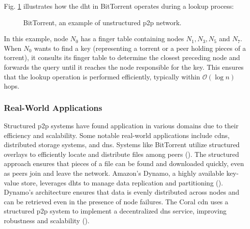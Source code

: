 Fig. \ref{fig:BitTorrent} illustrates how the \gls{dht} in BitTorrent operates during a lookup process:
\begin{figure}[htbp]
    \centering
{}
\caption{BitTorrent, an example of unstructured \gls{p2p} network.}
\label{fig:BitTorrent}
\end{figure}

In this example, node $N_0$ has a finger table containing nodes $N_1, N_3, N_5$ and $N_7$.
When $N_0$ wants to find a key (representing a torrent or a peer holding pieces of a torrent), it consults its finger table to determine the closest preceding node and forwards the query until it reaches the node responsible for the key.
This ensures that the lookup operation is performed efficiently, typically within $\mathcal{O}(\log n)$ hops.

\subsubsection*{Real-World Applications}
Structured \gls{p2p} systems have found application in various domains due to their efficiency and scalability.
Some notable real-world applications include \glspl{cdn}, distributed storage systems, and \gls{dns}.
Systems like BitTorrent utilize structured overlays to efficiently locate and distribute files among peers (\cite{cohen2003incentives}).
The structured approach ensures that pieces of a file can be found and downloaded quickly, even as peers join and leave the network.
Amazon's Dynamo, a highly available key-value store, leverages \glspl{dht} to manage data replication and partitioning (\cite{DeCandia2007}).
Dynamo's architecture ensures that data is evenly distributed across nodes and can be retrieved even in the presence of node failures.
The Coral \gls{cdn} uses a structured \gls{p2p} system to implement a decentralized \gls{dns} service, improving robustness and scalability (\cite{CoralCDN2010}).

